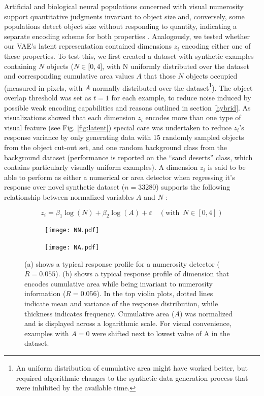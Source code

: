 \documentclass[twocolumn]{article}
\begin{document}
Artificial and biological neural populations concerned with visual
numerosity support quantitative judgments invariant to object size and,
conversely, some populations detect object size without responding to
quantity, indicating a separate encoding scheme for both properties
\citep{stoianov2012, harvey2013topographic}. Analogously, we tested
whether our VAE's latent representation contained dimensions \(z_i\)
encoding either one of these properties. To test this, we first created
a dataset with synthetic examples containing \(N\) objects
(\(N \in \lbrack 0, 4\rbrack\), with N uniformly distributed over the
dataset and corresponding cumulative area values \(A\) that those \(N\)
objects occupied (measured in pixels, with \(A\) normally distributed
over the dataset\footnote{An uniform distribution of cumulative area
  might have worked better, but required algorithmic changes to the
  synthetic data generation process that were inhibited by the available time.}). The object overlap threshold was set as $t=1$ for
each example, to reduce noise induced by possible weak encoding
capabilities and reasons outlined in section
\ref{hybrid}. As visualizations showed that each dimension \(z_i\) encodes more
than one type of visual feature (see Fig. \ref{fig:latent}) special care was
undertaken to reduce \(z_i\)'s response variance by only generating data
with 15 randomly sampled objects from the object cut-out set, and one
random background class from the background dataset (performance is
reported on the ``sand deserts'' class, which contains particularly
visually uniform examples). A dimension \(z_i\) is said to be able to
perform as either a numerical or area detector when regressing it's
response over novel synthetic dataset (\(n=33280\)) supports the
following relationship between normalized variables \(A\) and \(N\)
\citep{stoianov2012}:

\[z_i = \beta_1 \log(N) + \beta_2\log(A) + \varepsilon \quad (\textrm{with }\, N \in [0, 4]) \tag{2} \]

\begin{figure}[ht]
\centering
\begin{subfigure}{.5\textwidth}
  \centering
  \texttt{[image: NN.pdf]}
  \caption{}
  \label{fig:zn}
\end{subfigure}%
\begin{subfigure}{.5\textwidth}
  \centering
  \texttt{[image: NA.pdf]}
   \caption{}
  \label{fig:za}
\end{subfigure}
\caption{(a) shows a typical response profile for a numerosity detector ($R=0.055$).  (b) shows a typical response profile of dimension that encodes cumulative area while being invariant to numerosity information ($R=0.056$). In the top violin plots, dotted lines indicate mean and variance of the response distribution, while thickness indicates frequency. Cumulative area ($A$) was normalized and is displayed across a logarithmic scale. For visual convenience, examples with $A=0$ were shifted next to lowest value of A in the dataset.}
\label{fig:linear}
\end{figure}
\end{document}

